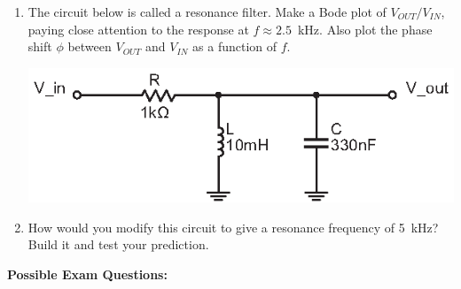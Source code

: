 \begin{enumerate}[wide]
\item The circuit below is called a resonance filter.  Make a Bode plot of $V_{OUT}/V_{IN}$, paying close attention to the response at $f \approx 2.5$~kHz.  Also plot the phase shift $\phi$ between $V_{OUT}$ and $V_{IN}$ as a function of $f$. 
\begin{center}
\includegraphics{filters/LC_resonance_filter.eps}
\end{center}

\item How would you modify this circuit to give a resonance frequency of 5~kHz?   Build it and test your prediction.


\end{enumerate}

\pagebreak[3]
\textbf{Possible Exam Questions:}

